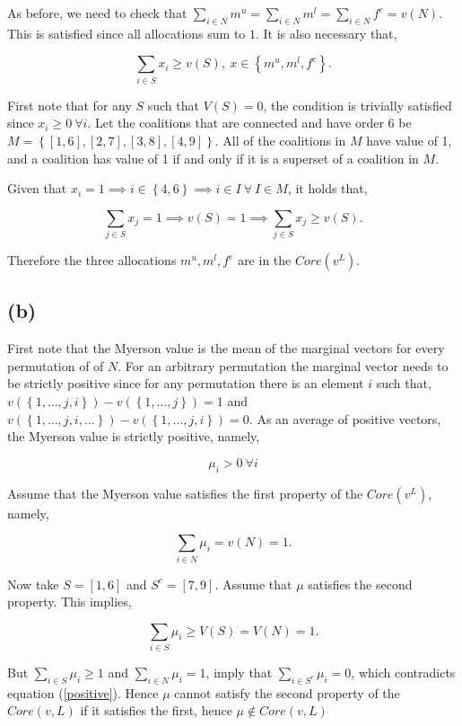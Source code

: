 \documentclass[american]{scrartcl}
\newcommand{\set}[1]{\left\{#1\right\}}
\begin{document}
As before, we need to check that $\sum_{i \in N} m^u = \sum_{i \in N} m^l = \sum_{i \in N} f^e = v(N) $. This is satisfied since all allocations sum to $1$. It is also necessary that,

\begin{equation}
    \sum_{i \in S} x_i \geq v(S), \ x \in \set{m^u, m^l, f^e}.
\end{equation}

First note that for any $S$ such that $V(S) = 0$, the condition is trivially satisfied since $x_i \geq 0 \ \forall i$. Let the coalitions that are connected and have order 6 be $M = \set{[1, 6], [2, 7], [3, 8], [4, 9]}$. All of the coalitions in $M$ have value of 1, and a coalition has value of 1 if and only if it is a superset of a coalition in $M$.

Given that $x_i = 1 \implies i \in \set{4, 6} \implies i \in I \  \forall \ I \in M$, it holds that,

\begin{equation}
    \sum_{j \in S} x_j = 1 \implies v(S) = 1 \implies \sum_{j \in S} x_j \geq v(S).
\end{equation}

Therefore the three allocations $m^u, m^l, f^e$ are in the $Core(v^L)$.

\subsection*{(b)}

First note that the Myerson value is the mean of the marginal vectors for every permutation of of $N$. For an arbitrary permutation the marginal vector needs to be strictly positive since for any permutation there is an element $i$ such that, $v(\set{1, \dots, j, i}) - v(\set{1, \dots, j}) = 1$ and $v(\set{1, \dots, j, i, \dots}) - v(\set{1, \dots, j, i})  = 0$. As an average of positive vectors, the Myerson value is strictly positive, namely,

\begin{equation} \label{positive}
    \mu_i > 0 \ \forall i
\end{equation}

Assume that the Myerson value satisfies the first property of the $Core(v^L)$, namely,

\begin{equation}
    \sum_{i \in N} \mu_i = v(N) = 1.
\end{equation}

Now take $S = [1, 6]$ and $S^c = [7, 9]$. Assume that $\mu$ satisfies the second property. This implies,

\begin{equation}
    \sum_{i \in S}\mu_i \geq V(S) = V(N) = 1.
\end{equation}

But $\sum_{i \in S}\mu_i \geq 1$ and $\sum_{i \in N}\mu_i = 1$, imply that $\sum_{i \in S^c}\mu_i = 0$, which contradicts equation (\ref{positive}). Hence $\mu$ cannot satisfy the second property of the $Core(v, L)$ if it satisfies the first, hence $\mu \notin Core(v, L)$
\end{document}
